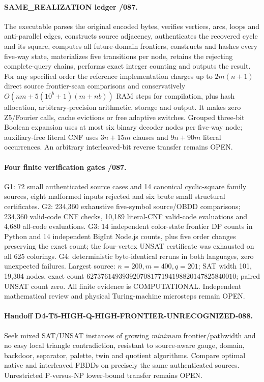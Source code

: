\documentclass[11pt]{article}
\begin{document}
\paragraph{SAME\_REALIZATION ledger /087.}
The executable parses the original encoded bytes, verifies vertices,
arcs, loops and anti-parallel edges, constructs source adjacency,
authenticates the recovered cycle and its square, computes all
future-domain frontiers, constructs and hashes every five-way state,
materializes five transitions per node, retains the rejecting
complete-query chains, performs exact integer counting and outputs
the result. For any specified order the reference implementation
charges up to $2m(n+1)$ direct source frontier-scan comparisons and
conservatively $O(nm+5(10^b+1)(m+nb))$ RAM steps for compilation,
plus hash allocation, arbitrary-precision arithmetic, storage and
output. It makes zero Z5/Fourier calls, cache evictions or free
adaptive switches. Grouped three-bit Boolean expansion uses at most
six binary decoder nodes per five-way node; auxiliary-free literal
CNF uses $3n+15m$ clauses and $9n+90m$ literal occurrences.
An arbitrary interleaved-bit reverse transfer remains OPEN.

\paragraph{Four finite verification gates /087.}
G1: 72 small authenticated source cases and 14 canonical cyclic-square
family sources, eight malformed inputs rejected and six brute
small structural certificates. G2: 234,360 exhaustive five-symbol
source/OBDD comparisons; 234,360 valid-code CNF checks, 10,189
literal-CNF valid-code evaluations and 4,680 all-code evaluations.
G3: 14 independent color-state frontier DP counts in Python and
14 independent BigInt Node.js counts, plus five order changes
preserving the exact count; the four-vertex UNSAT certificate was
exhausted on all 625 colorings. G4: deterministic byte-identical
reruns in both languages, zero unexpected failures. Largest
source: $n=200,m=400,q=201$; SAT width 101, 19,304 nodes,
exact count $627376149393920708177194198820147825840010$;
paired UNSAT count zero. All finite evidence is COMPUTATIONAL.
Independent mathematical review and physical Turing-machine
microsteps remain OPEN.

\paragraph{Handoff D4-T5-HIGH-Q-HIGH-FRONTIER-UNRECOGNIZED-088.}
Seek mixed SAT/UNSAT instances of growing \emph{minimum}
frontier/pathwidth and no easy local triangle contradiction,
resistant to source-aware gauge, domain, backdoor, separator,
palette, twin and quotient algorithms. Compare optimal
native and interleaved FBDDs on precisely the same authenticated
sources. Unrestricted P-versus-NP lower-bound transfer remains OPEN.
\end{document}
